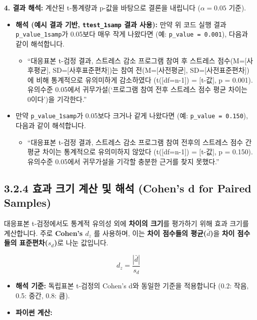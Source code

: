 \documentclass[
  letterpaper,
]{book}
\providecommand{\tightlist}{%
  \setlength{\itemsep}{0pt}\setlength{\parskip}{0pt}}
\begin{document}
\textbf{4. 결과 해석:} 계산된 t-통계량과 p-값을 바탕으로 결론을 내립니다
(\(\alpha = 0.05\) 기준).

\begin{itemize}
\tightlist
\item
  \textbf{해석 (예시 결과 기반, \texttt{ttest\_1samp} 결과 사용):} 만약
  위 코드 실행 결과 \texttt{p\_value\_1samp}가 0.05보다 매우 작게
  나왔다면 (예: \texttt{p\_value\ =\ 0.001}), 다음과 같이 해석합니다.

  \begin{itemize}
  \tightlist
  \item
    ``대응표본 t-검정 결과, 스트레스 감소 프로그램 참여 후 스트레스
    점수(M={[}사후평균{]}, SD={[}사후표준편차{]})는 참여
    전(M={[}사전평균{]}, SD={[}사전표준편차{]})에 비해 통계적으로
    유의미하게 감소하였다 (t({[}df=n-1{]}) = {[}t-값{]}, p = 0.001).
    유의수준 0.05에서 귀무가설(`프로그램 참여 전후 스트레스 점수 평균
    차이는 0이다')을 기각한다.''
  \end{itemize}
\item
  만약 \texttt{p\_value\_1samp}가 0.05보다 크거나 같게 나왔다면 (예:
  \texttt{p\_value\ =\ 0.150}), 다음과 같이 해석합니다.

  \begin{itemize}
  \tightlist
  \item
    ``대응표본 t-검정 결과, 스트레스 감소 프로그램 참여 전후의 스트레스
    점수 간 평균 차이는 통계적으로 유의미하지 않았다 (t({[}df=n-1{]}) =
    {[}t-값{]}, p = 0.150). 유의수준 0.05에서 귀무가설을 기각할 충분한
    근거를 찾지 못했다.''
  \end{itemize}
\end{itemize}

\subsection{3.2.4 효과 크기 계산 및 해석 (Cohen's d for Paired
Samples)}\label{uxd6a8uxacfc-uxd06cuxae30-uxacc4uxc0b0-uxbc0f-uxd574uxc11d-cohens-d-for-paired-samples}

대응표본 t-검정에서도 통계적 유의성 외에 \textbf{차이의 크기}를 평가하기
위해 효과 크기를 계산합니다. 주로 \textbf{Cohen's \(d_z\)} 를 사용하며,
이는 \textbf{차이 점수들의 평균(\(\bar{d}\))}을 \textbf{차이 점수들의
표준편차(\(s_d\))}로 나눈 값입니다.

\[d_z = \frac{|\bar{d}|}{s_d}\]

\begin{itemize}
\tightlist
\item
  \textbf{해석 기준:} 독립표본 t-검정의 Cohen's d와 동일한 기준을
  적용합니다 (0.2: 작음, 0.5: 중간, 0.8: 큼).
\item
  \textbf{파이썬 계산:}
\end{itemize}
\end{document}
